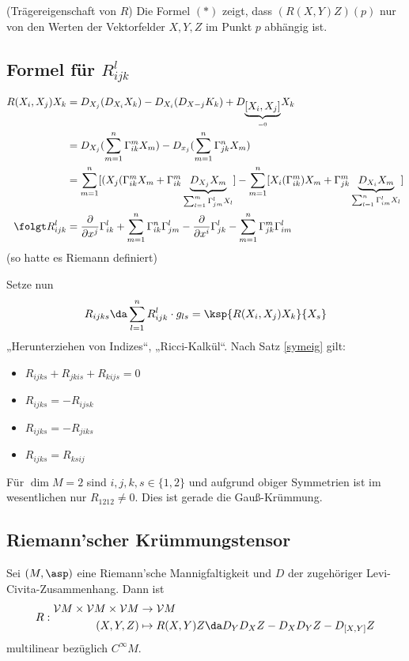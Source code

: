 \documentclass[a4paper,twoside,DIV15,BCOR12mm]{scrbook}
\newcommand{\V}{\mathcal V}
\begin{document}
\begin{bemerkung} (Trägereigenschaft von $R$)
Die Formel $(*)$ zeigt, dass $(R(X,Y)Z)(p)$ nur von den Werten der Vektorfelder $X,Y,Z$ im Punkt $p$ abhängig ist.
\end{bemerkung}

\subsection*{Formel für $R_{ijk}^l$}
\begin{align*}
R(X_i,X_j)X_k &= D_{X_j}(D_{X_i}X_k) - D_{X_i}(D_{X-j}K_k) + D_{\underbrace{[X_i,X_j]}_{=0}}X_k \\
&=  D_{X_j}(\sum_{m=1}^n \Gamma_{ik}^m X_m) - D_{x_j}(\sum_{m=1}^n \Gamma_{jk}^n X_m) \\
&= \sum_{m=1}^n [ (X_j (\Gamma_{ik}^m X_m + \Gamma_{ik}^m \underbrace{D_{X_j}X_m}_{\sum_{l=1}^m \Gamma_{jm}^l X_l} ] - \sum_{m=1}^n [X_i (\Gamma_{ik}^m) X_m + \Gamma_{jk}^m \underbrace{D_{X_i}X_m}_{\sum_{l=1}^n \Gamma_{im}^l X_l } ] \\
\folgt R_{ijk}^l &= \frac{\partial}{\partial x^j} \Gamma_{ik}^l + \sum_{m=1}^n \Gamma_{ik}^n \Gamma_{jm}^l - \frac{\partial}{\partial x^i} \Gamma_{jk}^l - \sum_{m=1}^n \Gamma_{jk}^m \Gamma_{im}^l
\end{align*}
(so hatte es Riemann definiert)

Setze nun
\[
R_{ijks} \da \sum_{l=1}^n R_{ijk}^l \cdot g_{ls} = \ksp {R(X_i,X_j)X_k} {X_s}
\]
„Herunterziehen von Indizes“, „Ricci-Kalkül“. Nach Satz \ref{symeig} gilt:
\begin{itemize}
\item $R_{ijks} + R_{jkis} + R_{kijs} = 0$
\item $R_{ijks} = -R_{ijsk}$
\item $R_{ijks} = -R_{jiks}$
\item $R_{ijks} = R_{ksij}$
\end{itemize}

\begin{bemerkung}
Für $\dim M=2$ sind $i,j,k,s \in \{1,2\}$ und aufgrund obiger Symmetrien ist im wesentlichen nur $R_{1212} \ne 0$. Dies ist gerade die Gauß-Krümmung.
\end{bemerkung}


\subsection*{Riemann’scher Krümmungstensor}

Sei $(M,\asp)$ eine Riemann’sche Mannigfaltigkeit und $D$ der zugehöriger Levi-Civita-Zusammenhang. Dann ist
\[
R:
\begin{aligned}
\V M \times \V M \times \V M  &\to \V M \\
(X,Y,Z) &\mapsto R(X,Y)Z \da D_YD_XZ - D_XD_YZ - D_{[X,Y]}Z
\end{aligned}
\]
multilinear bezüglich $C^\infty M$.
\end{document}
